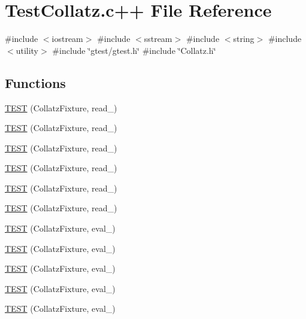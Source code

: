 \hypertarget{TestCollatz_8c_09_09}{\section{\-Test\-Collatz.\-c++ \-File \-Reference}
\label{TestCollatz_8c_09_09}
}
{\ttfamily \#include $<$iostream$>$}\*
{\ttfamily \#include $<$sstream$>$}\*
{\ttfamily \#include $<$string$>$}\*
{\ttfamily \#include $<$utility$>$}\*
{\ttfamily \#include \char`\"{}gtest/gtest.\-h\char`\"{}}\*
{\ttfamily \#include \char`\"{}\-Collatz.\-h\char`\"{}}\*
\subsection*{\-Functions}
\begin{DoxyCompactItemize}
\item 
\hyperlink{TestCollatz_8c_09_09_a66f4163404a0842f4f9eb6dcbfb35580}{\-T\-E\-S\-T} (\-Collatz\-Fixture, read\-\_)
\item 
\hyperlink{TestCollatz_8c_09_09_a3187ab2baa687bc11ef1402f3c5ac249}{\-T\-E\-S\-T} (\-Collatz\-Fixture, read\-\_)
\item 
\hyperlink{TestCollatz_8c_09_09_a910fd6352964fadd13f189dfb49f46f4}{\-T\-E\-S\-T} (\-Collatz\-Fixture, read\-\_)
\item 
\hyperlink{TestCollatz_8c_09_09_a0b5a76cb98b330891857af6177a4ee52}{\-T\-E\-S\-T} (\-Collatz\-Fixture, read\-\_)
\item 
\hyperlink{TestCollatz_8c_09_09_aa2d3f1b8554892f4930b617b4259625a}{\-T\-E\-S\-T} (\-Collatz\-Fixture, read\-\_)
\item 
\hyperlink{TestCollatz_8c_09_09_a589b47d5256ad73b8b982719d4785b4a}{\-T\-E\-S\-T} (\-Collatz\-Fixture, read\-\_)
\item 
\hyperlink{TestCollatz_8c_09_09_ada96ca639b20365c6ba23d44029e0833}{\-T\-E\-S\-T} (\-Collatz\-Fixture, eval\-\_)
\item 
\hyperlink{TestCollatz_8c_09_09_aa0fcdadaf0d4f7fe0919c37746fe7c74}{\-T\-E\-S\-T} (\-Collatz\-Fixture, eval\-\_)
\item 
\hyperlink{TestCollatz_8c_09_09_a333bb6921f06fa177e9818dbcf3eda06}{\-T\-E\-S\-T} (\-Collatz\-Fixture, eval\-\_)
\item 
\hyperlink{TestCollatz_8c_09_09_a251001c75c1226c607534268ab3a5bcb}{\-T\-E\-S\-T} (\-Collatz\-Fixture, eval\-\_)
\item 
\hyperlink{TestCollatz_8c_09_09_a033aa388470c35adc9579303dba1afa2}{\-T\-E\-S\-T} (\-Collatz\-Fixture, eval\-\_)

\end{DoxyCompactItemize}

